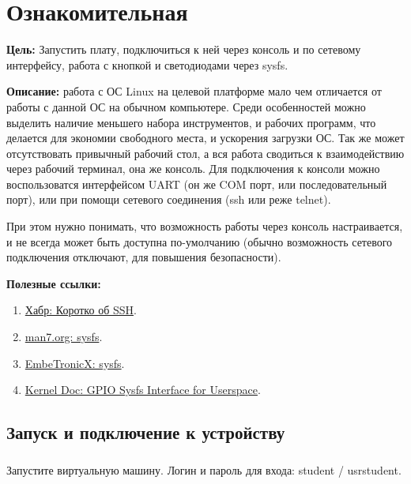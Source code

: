 \chapter{Ознакомительная}
\textbf{Цель:} Запустить плату, подключиться к ней через консоль и по сетевому интерфейсу, работа с кнопкой и светодиодами через sysfs.

\vspace{5mm}
\textbf{Описание:} работа с ОС Linux на целевой платформе мало чем отличается от работы с данной ОС на обычном компьютере. Среди особенностей можно выделить наличие меньшего набора инструментов, и рабочих программ, что делается для экономии свободного места, и ускорения загрузки ОС. Так же может отсутствовать привычный рабочий стол, а вся работа сводиться к взаимодействию через рабочий терминал, она же консоль. Для подключения к консоли можно воспользоватся интерфейсом UART (он же COM порт, или последовательный порт), или при помощи сетевого соединения (ssh или реже telnet). 

При этом нужно понимать, что возможность работы через консоль настраивается, и не всегда может быть доступна по-умолчанию (обычно возможность сетевого подключения отключают, для повышения безопасности). 

\vspace{5mm}
\textbf{Полезные ссылки:}
\begin{enumerate}
	\item \href{https://habr.com/ru/sandbox/166705/}{Хабр: Коротко об SSH}.
	\item \href{https://man7.org/linux/man-pages/man5/sysfs.5.html}{man7.org: sysfs}.
	\item \href{https://embetronicx.com/tutorials/linux/device-drivers/sysfs-in-linux-kernel/}{EmbeTronicX: sysfs}.
	\item \href{https://www.kernel.org/doc/Documentation/gpio/sysfs.txt}{Kernel Doc: GPIO Sysfs Interface for Userspace}.	
\end{enumerate}

\section{Запуск и подключение к устройству}

\subsection{}Запустите виртуальную машину. Логин и пароль для входа: student / usrstudent.

